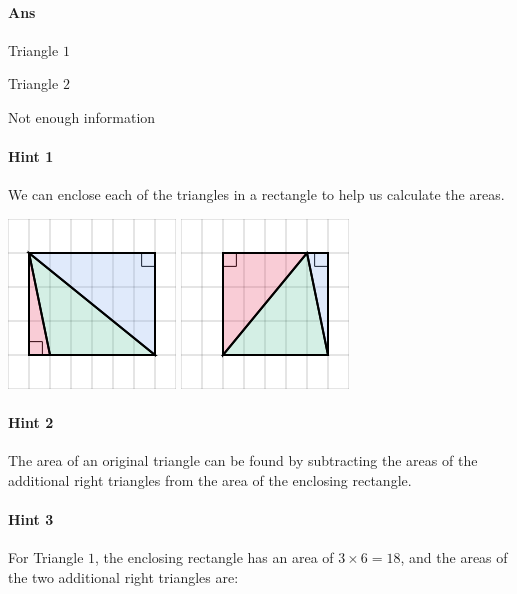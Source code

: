 \documentclass[twocolumn,10pt]{article}
\def\shrinkfactor{0.55}
\begin{document}
\paragraph{Ans} 

Triangle $1$

Triangle $2$


 Not enough information



\paragraph{Hint 1}We can enclose each of the triangles in a rectangle to help us calculate the areas.  

\includegraphics[scale=\shrinkfactor]{figures/654fe9a0a38e5306d6be147e41867389bd058f2d.png} 
\includegraphics[scale=\shrinkfactor]{figures/48e9376d7eecdea2a460607bf78e290aedee5505.png}

\paragraph{Hint 2}The area of an original triangle can be found by subtracting the areas of the additional right triangles from the area of the enclosing rectangle.  

\paragraph{Hint 3}For Triangle $1$, the enclosing rectangle has an area of $3 \times 6 = 18$, and the areas of the two additional right triangles are:  
\end{document}
